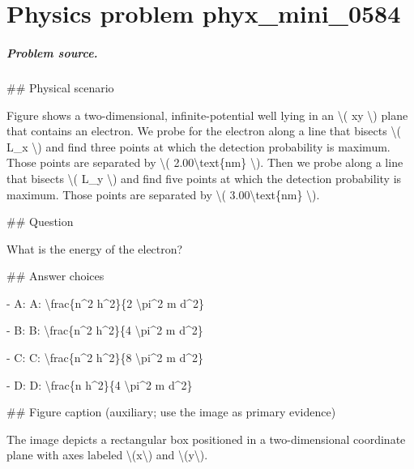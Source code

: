 
\chapter{Physics problem phyx\_mini\_0584}
\label{ch:PhyXMiniProblems_problem_phyx_mini_0584}

\paragraph{Problem source.}
\#\# Physical scenario

Figure shows a two-dimensional, infinite-potential well lying in an \textbackslash{}( xy \textbackslash{}) plane that contains an electron. We probe for the electron along a line that bisects \textbackslash{}( L\_x \textbackslash{}) and find three points at which the detection probability is maximum. Those points are separated by \textbackslash{}( 2.00\textbackslash{}text\{nm\} \textbackslash{}). Then we probe along a line that bisects \textbackslash{}( L\_y \textbackslash{}) and find five points at which the detection probability is maximum. Those points are separated by \textbackslash{}( 3.00\textbackslash{}text\{nm\} \textbackslash{}).

\#\# Question

What is the energy of the electron?

\#\# Answer choices

- A: A: \textbackslash{}frac\{n\textasciicircum{}2 h\textasciicircum{}2\}\{2 \textbackslash{}pi\textasciicircum{}2 m d\textasciicircum{}2\}

- B: B: \textbackslash{}frac\{n\textasciicircum{}2 h\textasciicircum{}2\}\{4 \textbackslash{}pi\textasciicircum{}2 m d\textasciicircum{}2\}

- C: C: \textbackslash{}frac\{n\textasciicircum{}2 h\textasciicircum{}2\}\{8 \textbackslash{}pi\textasciicircum{}2 m d\textasciicircum{}2\}

- D: D: \textbackslash{}frac\{n h\textasciicircum{}2\}\{4 \textbackslash{}pi\textasciicircum{}2 m d\textasciicircum{}2\}

\#\# Figure caption (auxiliary; use the image as primary evidence)

The image depicts a rectangular box positioned in a two-dimensional coordinate plane with axes labeled \textbackslash{}(x\textbackslash{}) and \textbackslash{}(y\textbackslash{}).

